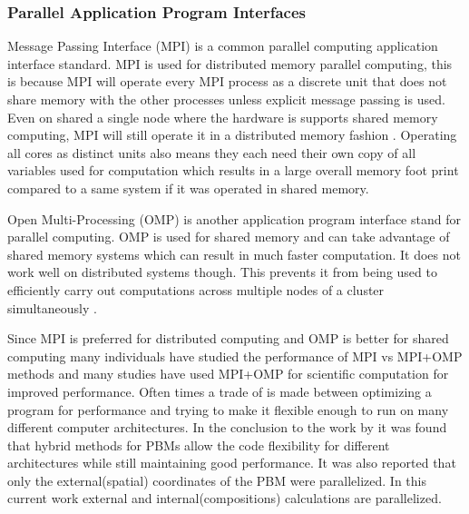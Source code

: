 \documentclass[preprint,11pt,authoryear]{elsarticle}
\begin{document}
\subsubsection{Parallel Application Program Interfaces}
\par Message Passing Interface (MPI) is a common parallel computing application interface standard. 
MPI is used for distributed memory parallel computing, this is because MPI will operate every MPI 
process as a discrete unit that does not share memory with the other processes unless explicit 
message passing is used. Even on shared a single node where the hardware is supports shared 
memory computing, MPI will still operate it in a distributed memory fashion \cite{Jin2011}. Operating all 
cores as distinct units also means they each need their own copy of all variables used for computation 
which results in a large overall memory foot print compared to a same system if it was operated in 
shared memory. 
\par Open Multi-Processing (OMP) is another application program interface stand for parallel 
computing. OMP is used for shared memory and can take advantage of shared memory systems which 
can result in much faster computation. It does not work well on distributed systems though. This 
prevents it from being used to efficiently carry out computations across multiple nodes of a cluster 
simultaneously \cite{Jin2011}. 
\par Since MPI is preferred for distributed computing and OMP is better for shared computing many 
individuals have studied the performance of MPI vs MPI+OMP methods and many studies have used 
MPI+OMP for scientific computation for improved performance. Often times a trade of is made 
between optimizing a program for performance and trying to make it flexible enough to run on many 
different computer architectures. In the conclusion to the work by \cite{Bettencourt2017} it was found 
that hybrid methods for PBMs allow the code flexibility for different architectures while still maintaining 
good performance.  It was also reported that only the external(spatial) coordinates of the PBM were 
parallelized. In this current work external and internal(compositions) calculations are parallelized. 
\end{document}
